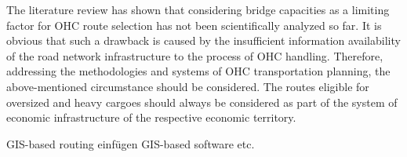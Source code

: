 The literature review has shown that considering bridge capacities as a limiting factor for OHC route selection has not been scientifically analyzed so far.
It is obvious that such a drawback is caused by the insufficient information availability of the road network infrastructure to the process of OHC handling.
Therefore, addressing the methodologies and systems of OHC transportation planning, the above-mentioned circumstance should be considered.
The routes eligible for oversized and heavy cargoes should always be considered as part of the system of economic infrastructure of the respective economic territory.

GIS-based routing einfügen
GIS-based software etc.


%
%
%
%

